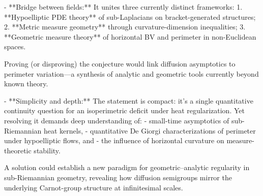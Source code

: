 - **Bridge between fields:** It unites three currently distinct frameworks:
  1. **Hypoelliptic PDE theory** of sub-Laplacians on bracket-generated structures;  
  2. **Metric measure geometry** through curvature-dimension inequalities;  
  3. **Geometric measure theory** of horizontal BV and perimeter in non-Euclidean spaces.  

  Proving (or disproving) the conjecture would link diffusion asymptotics to perimeter variation—a synthesis of analytic and geometric tools currently beyond known theory.

- **Simplicity and depth:** The statement is compact: it’s a single quantitative continuity question for an isoperimetric deficit under heat regularization. Yet resolving it demands deep understanding of:
  - small-time asymptotics of sub-Riemannian heat kernels,
  - quantitative De Giorgi characterizations of perimeter under hypoelliptic flows, and  
  - the influence of horizontal curvature on measure-theoretic stability.

A solution could establish a new paradigm for geometric–analytic regularity in sub-Riemannian geometry, revealing how diffusion semigroups mirror the underlying Carnot-group structure at infinitesimal scales.